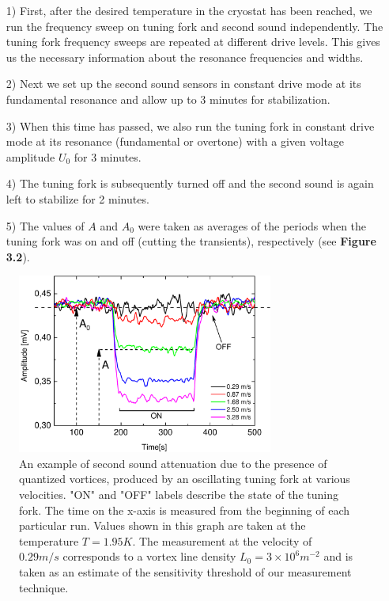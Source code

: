 \begin{itemize}
	\item[1)] First, after the desired temperature in the cryostat has been reached, we run the frequency sweep on tuning fork and second sound independently. The tuning fork frequency sweeps are repeated at different drive levels. This gives us the necessary information about the resonance frequencies and widths.
	
	\item[2)] Next we set up the second sound sensors in constant drive mode at its fundamental resonance and allow up to 3 minutes for stabilization.
	
	\item[3)] When this time has passed, we also run the tuning fork in constant drive mode at its resonance (fundamental or overtone) with a given voltage amplitude $ U_0 $ for 3 minutes.
	
	\item[4)] The tuning fork is subsequently turned off and the second sound is again left to stabilize for 2 minutes.

	\item[5)] The values of $ A $ and $ A_0 $ were taken as averages of the periods when the tuning fork was on and off (cutting the transients), respectively (see {\sffamily\textbf{Figure 3.2}}).
\end{itemize}


\begin{figure}[h!]
\centering
\includegraphics[width=0.75\textwidth]{graphs/Attenuation.pdf}
\caption{An example of second sound attenuation due to the presence of quantized vortices, produced by an oscillating tuning fork at various velocities. "ON" and "OFF" labels describe the state of the tuning fork. The time on the x-axis is measured from the beginning  of each particular run. Values shown in this graph are taken at the temperature $ T=1.95\unit{K} $. The measurement at the velocity of $0.29\unit{m/s}$ corresponds to a vortex line density $L_0 = 3 \times 10^6 \unit{m}^{-2}$ and is taken as an estimate of the sensitivity threshold of our measurement technique.}
\end{figure}


